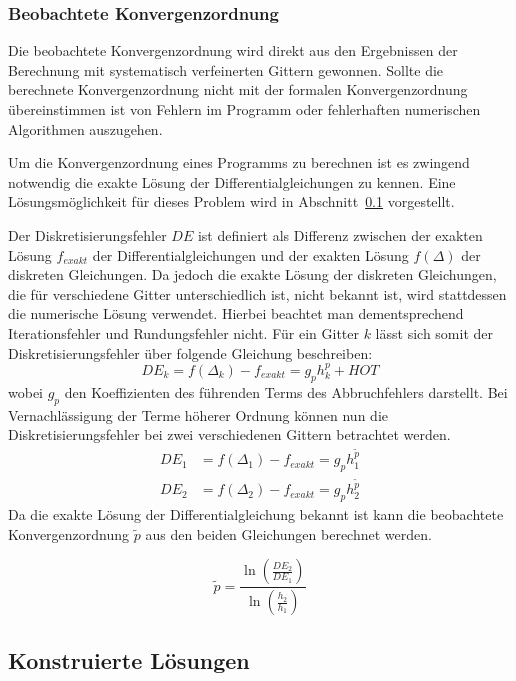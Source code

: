 \subsubsection{Beobachtete Konvergenzordnung}

Die beobachtete Konvergenzordnung wird direkt aus den Ergebnissen der Berechnung mit systematisch
verfeinerten Gittern gewonnen. Sollte die berechnete Konvergenzordnung nicht mit der formalen
Konvergenzordnung übereinstimmen ist von Fehlern im Programm oder fehlerhaften numerischen Algorithmen auszugehen.

Um die Konvergenzordnung eines Programms zu berechnen ist es zwingend notwendig die exakte Lösung der
Differentialgleichungen zu kennen. Eine Lösungsmöglichkeit für dieses Problem wird in Abschnitt~\ref{sec:man_sol}
vorgestellt.

Der Diskretisierungsfehler $DE$ ist definiert als Differenz zwischen der exakten Lösung $f_{exakt}$
der Differentialgleichungen und der exakten Lösung $f(\Delta)$ der diskreten Gleichungen.
Da jedoch die exakte Lösung der diskreten Gleichungen, die für verschiedene Gitter unterschiedlich ist,
nicht bekannt ist, wird stattdessen die numerische Lösung verwendet. Hierbei beachtet man dementsprechend
Iterationsfehler und Rundungsfehler nicht. Für ein Gitter $k$ lässt sich somit der Diskretisierungsfehler
über folgende Gleichung beschreiben:
\begin{equation*}
  DE_k=f(\Delta_k) - f_{exakt} = g_p h_k^p + HOT
\end{equation*}
wobei $g_p$ den Koeffizienten des führenden Terms des Abbruchfehlers darstellt.
Bei Vernachlässigung der Terme höherer Ordnung können nun die Diskretisierungsfehler bei
zwei verschiedenen Gittern betrachtet werden.
\begin{align*}
  DE_1 &= f(\Delta_1) - f_{exakt} = g_p h_1^{\tilde{p}}\\
  DE_2 &= f(\Delta_2) - f_{exakt} = g_p h_2^{\tilde{p}}
\end{align*}
Da die exakte Lösung der Differentialgleichung bekannt ist kann die beobachtete Konvergenzordnung
$\tilde{p}$ aus den beiden Gleichungen berechnet werden.

\begin{equation}
  \tilde{p}=\frac{\ln \left(\frac{DE_2}{DE_1}\right)}{\ln \left(\frac{h_2}{h_1}\right)}
  \label{eq:beobachtet}
\end{equation}


\subsection{Konstruierte Lösungen}
\label{sec:man_sol}

